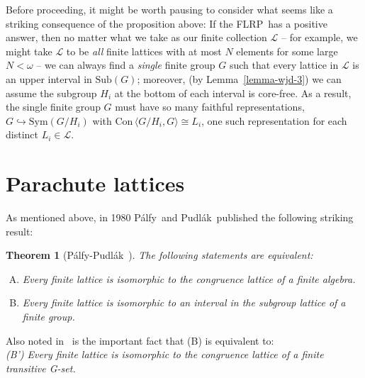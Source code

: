 \documentclass[cm,dissertation,actual,final]{uhthesis}
\theoremstyle{plain}
\newtheorem{theorem}{Theorem}[section]
\theoremstyle{definition}
\theoremstyle{remark}
\numberwithin{theorem}{section}
\numberwithin{claim}{chapter}
\numberwithin{equation}{section}
\numberwithin{conjecture}{chapter}
\newcommand{\Palfy}{P\'alfy}
\newcommand{\Pudlak}{Pudl\'ak}
\newcommand{\<}{\ensuremath{\langle}}
\renewcommand{\>}{\ensuremath{\rangle}}
\newcommand{\Con}{\ensuremath{\mathrm{Con\,}}}
\newcommand{\Sub}{\ensuremath{\mathrm{Sub}}}
\newcommand{\Sym}{\ensuremath{\mathrm{Sym}}}
\newcommand{\FLRP}{{\small FLRP}}
\newcommand{\0}{\ensuremath{\mathbf{0}}}
\newcommand{\1}{\ensuremath{\mathbf{1}}}
\newcommand{\2}{\ensuremath{\mathbf{2}}}
\newcommand{\3}{\ensuremath{\mathbf{3}}}
\newcommand{\4}{\ensuremath{\mathbf{4}}}
\newcommand{\5}{\ensuremath{\mathbf{5}}}
\newcommand{\sL}{\ensuremath{\mathscr{L}}}
\begin{document}
Before proceeding, it might be worth pausing to consider what seems like a
striking consequence of the proposition above: 
If the \FLRP\ has a positive answer, then no matter 
what we take as our finite collection $\sL$ -- for example, we
might take $\sL$ to be \emph{all} finite lattices with
at most $N$ elements for some large $N< \omega$ -- we can always find a \emph{single}
finite group $G$ such that every lattice in $\sL$ is an upper interval in
$\Sub(G)$; moreover, (by Lemma~\ref{lemma-wjd-3}) we can assume the subgroup
$H_i$ at the bottom of each interval is core-free.  As a result, the single
finite group $G$ must have so many faithful representations,  $G\hookrightarrow \Sym(G/H_i)$
with  $\Con\<G/H_i, G\> \cong L_i$,  one such representation for each distinct $L_i\in \sL$. 

\section{Parachute lattices}
\label{sec:parachute-lattices}
%
%
As mentioned above, in 1980 \Palfy\ and \Pudlak\ published the following
striking result:
\begin{theorem}[\Palfy-\Pudlak~\cite{Palfy:1980}]
\label{thm:P5}
The following statements are equivalent:
\begin{enumerate}[(A)]
\item Every finite lattice is isomorphic to
  the congruence lattice of a finite algebra.
\item Every finite lattice is isomorphic to
  an interval in the subgroup lattice of a finite group.
\end{enumerate}
\end{theorem}
\noindent Also noted in~\cite{Palfy:1980} is the important fact that (B) is equivalent to:
\\[4pt]
{\it (B') Every finite lattice is isomorphic to
  the congruence lattice of a finite transitive G-set.}

\vskip3mm
\end{document}
